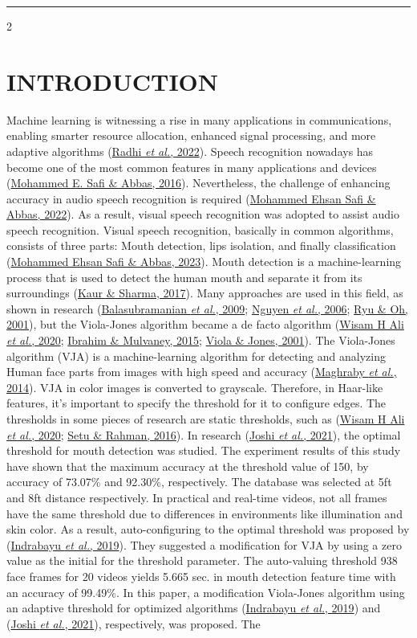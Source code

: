\documentclass[9pt]{extarticle}
\renewcommand{\normalsize}{\fontsize{9pt}{9pt}\selectfont}
\begin{document}
\normalsize
\noindent \rule{\textwidth}{0.75pt}
\begin{multicols}{2}
\section{INTRODUCTION}
Machine learning is witnessing a rise in many applications in communications, enabling smarter resource allocation, enhanced signal processing, and more adaptive algorithms (\hyperlink{ref:14}{Radhi \textit{et al.}, 2022}). Speech recognition nowadays has become one of the most common features in many applications and devices (\hyperlink{ref:16}{Mohammed E. Safi \& Abbas, 2016}). Nevertheless, the challenge of enhancing accuracy in audio speech recognition is required (\hyperlink{ref:17}{Mohammed Ehsan Safi \& Abbas, 2022}). As a result, visual speech recognition was adopted to assist audio speech recognition. Visual speech recognition, basically in common algorithms, consists of three parts: Mouth detection, lips isolation, and finally classification (\hyperlink{ref:18}{Mohammed Ehsan Safi \& Abbas, 2023}). Mouth detection is a machine-learning process that is used to detect the human mouth and separate it from its surroundings (\hyperlink{ref:8}{Kaur \& Sharma, 2017}). Many approaches are used in this field, as shown in research (\hyperlink{ref:3}{Balasubramanian \textit{et al.}, 2009}; \hyperlink{ref:12}{Nguyen \textit{et al.}, 2006}; \hyperlink{ref:15}{Ryu \& Oh, 2001}), but the Viola-Jones algorithm became a de facto algorithm (\hyperlink{ref:1}{Wisam H Ali \textit{et al.}, 2020}; \hyperlink{ref:5}{Ibrahim \& Mulvaney, 2015}; \hyperlink{ref:20}{Viola \& Jones, 2001}). The Viola-Jones algorithm (VJA) is a machine-learning algorithm for detecting and analyzing Human face parts from images with high speed and accuracy (\hyperlink{ref:10}{Maghraby \textit{et al.}, 2014}). VJA in color images is converted to grayscale. Therefore, in Haar-like features, it's important to specify the threshold for it to configure edges. The thresholds in some pieces of research are static thresholds, such as (\hyperlink{ref:1}{Wisam H Ali \textit{et al.}, 2020}; \hyperlink{ref:19}{Setu \& Rahman, 2016}). In research (\hyperlink{ref:7}{Joshi \textit{et al.}, 2021}), the optimal threshold for mouth detection was studied. The experiment results of this study have shown that the maximum accuracy at the threshold value of 150, by accuracy of 73.07\% and 92.30\%, respectively. The database was selected at 5ft and 8ft distance respectively. In practical and real-time videos, not all frames have the same threshold due to differences in environments like illumination and skin color. As a result, auto-configuring to the optimal threshold was proposed by (\hyperlink{ref:6}{Indrabayu \textit{et al.}, 2019}). They suggested a modification for VJA by using a zero value as the initial for the threshold parameter. The auto-valuing threshold 938 face frames for 20 videos yields 5.665 sec. in mouth detection feature time with an accuracy of 99.49\%. In this paper, a modification Viola-Jones algorithm using an adaptive threshold for optimized algorithms (\hyperlink{ref:6}{Indrabayu \textit{et al.}, 2019}) and (\hyperlink{ref:7}{Joshi \textit{et al.}, 2021}), respectively, was proposed. The 
\end{multicols}
\end{document}
